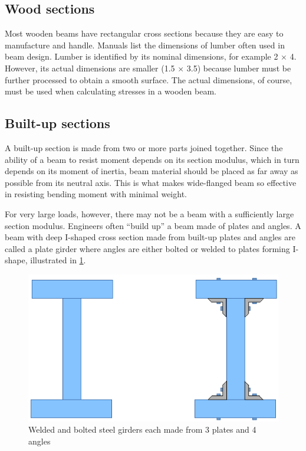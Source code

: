 \documentclass[
10pt,
a4paper,
openany,
svgnames,
]{book}
\begin{document}
\subsection{Wood sections}

Most wooden beams have rectangular cross sections because they are easy to manufacture and handle. Manuals list the dimensions of lumber often used in beam design. Lumber is identified by its nominal dimensions, for example 2 $\times$ 4. However, its actual dimensions are smaller (1.5 $\times$ 3.5) because lumber must be further processed to obtain a smooth surface. The actual dimensions, of course, must be used when calculating stresses in a wooden beam.

\subsection{Built-up sections}

A built-up section is made from two or more parts joined together. Since the ability of a beam to resist moment depends on its section modulus, which in turn depends on its moment of inertia, beam material should be placed as far away as possible from its neutral axis. This is what makes wide-flanged beam so effective in resisting bending moment with minimal weight.

For very large loads, however, there may not be a beam with a sufficiently large section modulus. Engineers often “build up” a beam made of plates and angles. A beam with deep I-shaped cross section made from built-up plates and angles are called a plate girder where angles are either bolted or welded to plates forming I-shape, illustrated in \cref{fig: steel fabricated beam}.

\begin{figure}[h]
  \centering
  \includegraphics[scale=0.8]{pictures/Simple-load-bearing/steel-fab-beams}
  \caption{Welded and bolted steel girders each made from 3 plates and 4 angles }
  \label{fig: steel fabricated beam}
\end{figure}
\end{document}
